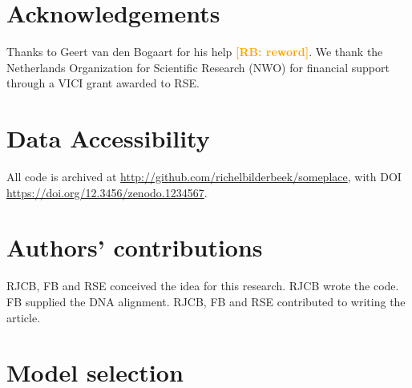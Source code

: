 \documentclass{article}
\newcommand{\richel}[1]{\textcolor{orange}{\textbf{[RB: #1]}}}
\begin{document}
\section{Acknowledgements}

Thanks to Geert van den Bogaart for his help \richel{reword}.
We thank the Netherlands 
Organization for Scientific Research (NWO) for financial support 
through a VICI grant awarded to RSE.

\section{Data Accessibility}

All code is archived at \url{http://github.com/richelbilderbeek/someplace},
with DOI \url{https://doi.org/12.3456/zenodo.1234567}.

\section{Authors' contributions}

RJCB, FB and RSE conceived the idea for this research. 
RJCB wrote the code.
FB supplied the DNA alignment.
RJCB, FB and RSE contributed to writing the article.




\appendix

\section{Model selection}
\end{document}
